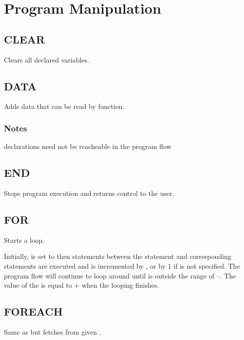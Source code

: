\section{Program Manipulation}

    \subsection{CLEAR}
        \par
        Clears all declared variables.
    \subsection{DATA}
        \par
        Adds data that can be read by  function.
        \subsubsection*{Notes}
        \begin{itemlist}
        \item {} declarations need not be reacheable in the program flow
        \end{itemlist}
    \subsection{END}
        \par
        Stops program execution and returns control to the user.
    \subsection{FOR}
        \par
        Starts a  loop.\par
        Initially,  is set to  then statements between the  statement and corresponding  statements are executed and  is incremented by , or by 1 if  is not specified. The program flow will continue to loop around until  is outside the range of --. The value of the  is equal to $+$ when the looping finishes.
    \subsection{FOREACH}
        \par
        Same as  but fetches  from given .
